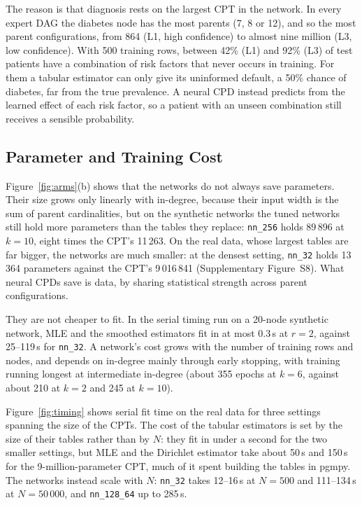 \documentclass[a4paper,fleqn]{cas-dc}
\begin{document}
The reason is that diagnosis rests on the largest CPT in the network. In every expert DAG the diabetes node has the most parents (7, 8 or 12), and so the most parent configurations, from 864 (L1, high confidence) to almost nine million (L3, low confidence). With 500 training rows, between 42\% (L1) and 92\% (L3) of test patients have a combination of risk factors that never occurs in training. For them a tabular estimator can only give its uninformed default, a 50\% chance of diabetes, far from the true prevalence. A neural CPD instead predicts from the learned effect of each risk factor, so a patient with an unseen combination still receives a sensible probability.

\subsection{Parameter and Training Cost}

Figure~\ref{fig:arms}(b) shows that the networks do not always save parameters. Their size grows only linearly with in-degree, because their input width is the sum of parent cardinalities, but on the synthetic networks the tuned networks still hold more parameters than the tables they replace: \texttt{nn\_256} holds 89\,896 at $k=10$, eight times the CPT's 11\,263. On the real data, whose largest tables are far bigger, the networks are much smaller: at the densest setting, \texttt{nn\_32} holds 13\,364 parameters against the CPT's 9\,016\,841 (Supplementary Figure~S8). What neural CPDs save is data, by sharing statistical strength across parent configurations.

They are not cheaper to fit. In the serial timing run on a 20-node synthetic network, MLE and the smoothed estimators fit in at most 0.3\,s at $r=2$, against 25--119\,s for \texttt{nn\_32}. A network's cost grows with the number of training rows and nodes, and depends on in-degree mainly through early stopping, with training running longest at intermediate in-degree (about 355 epochs at $k=6$, against about 210 at $k=2$ and 245 at $k=10$).

Figure~\ref{fig:timing} shows serial fit time on the real data for three settings spanning the size of the CPTs. The cost of the tabular estimators is set by the size of their tables rather than by $N$: they fit in under a second for the two smaller settings, but MLE and the Dirichlet estimator take about 50\,s and 150\,s for the 9-million-parameter CPT, much of it spent building the tables in pgmpy. The networks instead scale with $N$: \texttt{nn\_32} takes 12--16\,s at $N=500$ and 111--134\,s at $N=50\,000$, and \texttt{nn\_128\_64} up to 285\,s.
\end{document}
